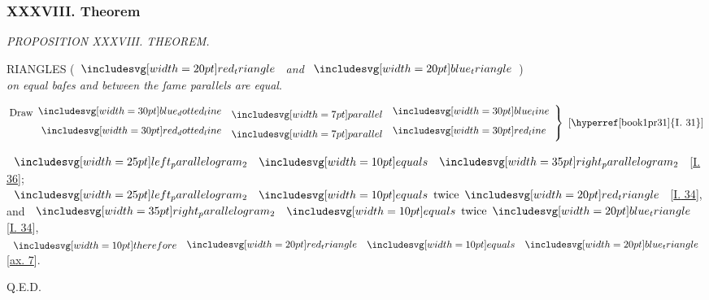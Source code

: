 \documentclass[11pt,preview]{standalone}
\begin{document}
\subsubsection{XXXVIII. Theorem}

\hfill

\begin{minipage}[t]{0.55\textwidth}
    \begin{center}
        \textit{PROPOSITION XXXVIII. THEOREM.}\label{book1pr38} \\
    \end{center}

    \hfill

    \begin{center}
        \raggedright \lettrine[lines=3, loversize=1, nindent=0pt]{}{}RIANGLES (\hspace{-1ex}$\img[0][0][20]{red_triangle}$ \textit{and} $\img[0][0][20]{blue_triangle}$\hspace{-1ex})\\ \textit{on equal baſes and between the ſame parallels are equal}.
    \end{center}
\end{minipage}%
\hfill
\begin{minipage}[t]{0.43\textwidth}
    \vspace{24pt}
    
\end{minipage}

\hfill

\hfill

\begin{center}
    $\left.\begin{aligned}\text{Draw}\dottedblueline & \bparallel \blueline \\ \dottedredline & \bparallel \redline \end{aligned}\right\}\text{ [\hyperref[book1pr31]{\textsc{I.} 31}]}$
\end{center}

\hfill

\hfill

\begin{center}
    $\img{left_parallelogram_2} \bequals \img[0][0][35]{right_parallelogram_2}$ [\hyperref[book1pr36]{\textsc{I.} 36}];\\
    $\img{left_parallelogram_2} \bequals \text{twice} \img[0][0][20]{red_triangle}$ [\hyperref[book1pr34]{\textsc{I.} 34}],\\
    and $\img[0][0][35]{right_parallelogram_2} \bequals \text{twice} \img[0][0][20]{blue_triangle}$ [\hyperref[book1pr34]{\textsc{I.} 34}],\\
    $\btherefore \img[0][0][20]{red_triangle} \bequals \img[0][0][20]{blue_triangle}$ [\hyperref[ax7]{ax. 7}].
\end{center}

\hfill

\hfill Q.E.D.
\end{document}
